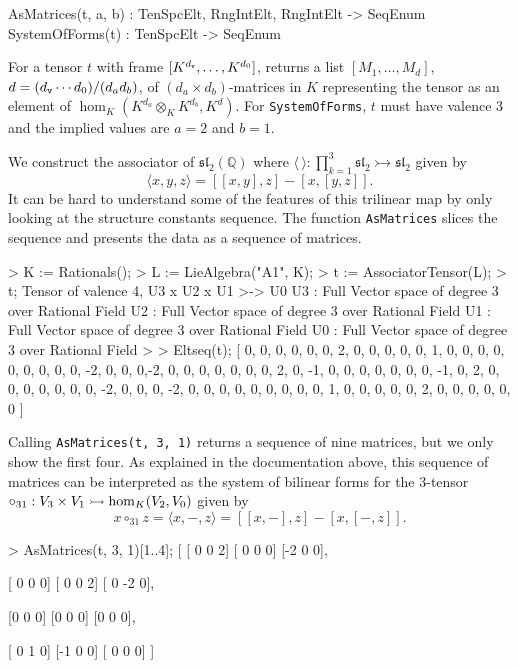 \begin{intrinsics}
AsMatrices(t, a, b) : TenSpcElt, RngIntElt, RngIntElt -> SeqEnum
SystemOfForms(t) : TenSpcElt -> SeqEnum
\end{intrinsics}

For a tensor $t$ with frame $[K^{d_{\operatorname{\mathtt{v}}}},\dots,K^{d_0}]$, 
returns a list $[M_1,\dots,M_d]$, $d=(d_{\operatorname{\mathtt{v}}}\cdots d_0)/(d_a d_b)$, 
of $(d_a\times d_b)$-matrices in $K$ representing the tensor
as an element of $\hom_K(K^{d_a}\otimes_K K^{d_b},K^d)$.
For \texttt{SystemOfForms}, $t$ must have valence $3$ and the implied values are $a=2$ and $b=1$.


\begin{example}[TrilinearAsMats]

We construct the associator of $\mathfrak{sl}_2(\mathbb{Q})$ where 
$\langle \,\rangle : \prod_{k=1}^3\mathfrak{sl}_2\rightarrowtail \mathfrak{sl}_2$ 
given by
\[ 
    \langle x,y,z \rangle = [[x,y],z] - [x,[y,z]]. 
\]
It can be hard to understand some of the features of this trilinear map by only
looking at the structure constants sequence. The function \texttt{AsMatrices}
slices the sequence and presents the data as a sequence of matrices.
\begin{code}
> K := Rationals();
> L := LieAlgebra("A1", K);
> t := AssociatorTensor(L);
> t;
Tensor of valence 4, U3 x U2 x U1 >-> U0
U3 : Full Vector space of degree 3 over Rational Field
U2 : Full Vector space of degree 3 over Rational Field
U1 : Full Vector space of degree 3 over Rational Field
U0 : Full Vector space of degree 3 over Rational Field
>
> Eltseq(t);
[ 0, 0, 0, 0, 0, 0, 2, 0, 0, 0, 0, 0, 1, 0, 0, 0, 0, 0, 0, 0, 0, 0, -2, 0, 0,
0,-2, 0, 0, 0, 0, 0, 0, 0, 2, 0, -1, 0, 0, 0, 0, 0, 0, 0, -1, 0, 2, 0, 0, 0,
0, 0, 0, 0, -2, 0, 0, 0, -2, 0, 0, 0, 0, 0, 0, 0, 0, 0, 1, 0, 0, 0, 0, 0, 2,
0, 0, 0, 0, 0, 0 ]
\end{code}

Calling \texttt{AsMatrices(t, 3, 1)} returns a sequence of nine matrices, but we
only show the first four. As explained in the documentation above, this sequence
of matrices can be interpreted as the system of bilinear forms for the 3-tensor
$\circ_{31} : V_3 \times V_1 \rightarrowtail \operatorname{hom}_K(V_2,V_0)$ given by
\[ x\circ_{31} z = \langle x, -,z \rangle = [[x,-],z] - [x,[-,z]].\]

\begin{code}
> AsMatrices(t, 3, 1)[1..4];
[
    [ 0  0  2]
    [ 0  0  0]
    [-2  0  0],

    [ 0  0  0]
    [ 0  0  2]
    [ 0 -2  0],

    [0 0 0]
    [0 0 0]
    [0 0 0],

    [ 0  1  0]
    [-1  0  0]
    [ 0  0  0]
]
\end{code}
\end{example}



